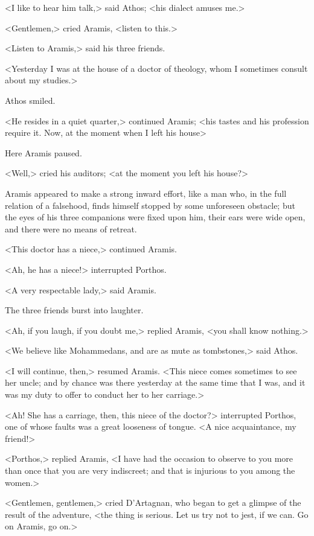 <I like to hear him talk,> said Athos; <his dialect amuses me.> 

<Gentlemen,> cried Aramis, <listen to this.> 

<Listen to Aramis,> said his three friends. 

<Yesterday I was at the house of a doctor of theology, whom I sometimes consult about my studies.> 

Athos smiled. 

<He resides in a quiet quarter,> continued Aramis; <his tastes and his profession require it. Now, at the moment when I left his house\longdash> 

Here Aramis paused. 

<Well,> cried his auditors; <at the moment you left his house?> 

Aramis appeared to make a strong inward effort, like a man who, in the full relation of a falsehood, finds himself stopped by some unforeseen obstacle; but the eyes of his three companions were fixed upon him, their ears were wide open, and there were no means of retreat. 

<This doctor has a niece,> continued Aramis. 

<Ah, he has a niece!> interrupted Porthos. 

<A very respectable lady,> said Aramis. 

The three friends burst into laughter. 

<Ah, if you laugh, if you doubt me,> replied Aramis, <you shall know nothing.> 

<We believe like Mohammedans, and are as mute as tombstones,> said Athos. 

<I will continue, then,> resumed Aramis. <This niece comes sometimes to see her uncle; and by chance was there yesterday at the same time that I was, and it was my duty to offer to conduct her to her carriage.> 

<Ah! She has a carriage, then, this niece of the doctor?> interrupted Porthos, one of whose faults was a great looseness of tongue. <A nice acquaintance, my friend!> 

<Porthos,> replied Aramis, <I have had the occasion to observe to you more than once that you are very indiscreet; and that is injurious to you among the women.> 

<Gentlemen, gentlemen,> cried D'Artagnan, who began to get a glimpse of the result of the adventure, <the thing is serious. Let us try not to jest, if we can. Go on Aramis, go on.> 

